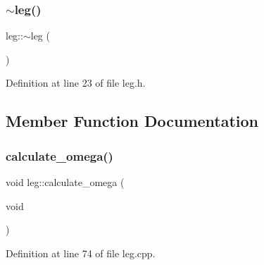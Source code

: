 \mbox{\label{classleg_abdce802c51dbf118f404973d796dd2d3}} 
\subsubsection{\texorpdfstring{$\sim$leg()}{~leg()}}
{\footnotesize\ttfamily leg\+::$\sim$leg (\begin{DoxyParamCaption}{ }\end{DoxyParamCaption})\hspace{0.3cm}{\ttfamily [inline]}}



Definition at line 23 of file leg.\+h.



\subsection{Member Function Documentation}
\mbox{\label{classleg_a79d1ecb4f9726e93192d77e596259905}} 
\subsubsection{\texorpdfstring{calculate\_omega()}{calculate\_omega()}}
{\footnotesize\ttfamily void leg\+::calculate\+\_\+omega (\begin{DoxyParamCaption}\item[{void}]{ }\end{DoxyParamCaption})}



Definition at line 74 of file leg.\+cpp.

